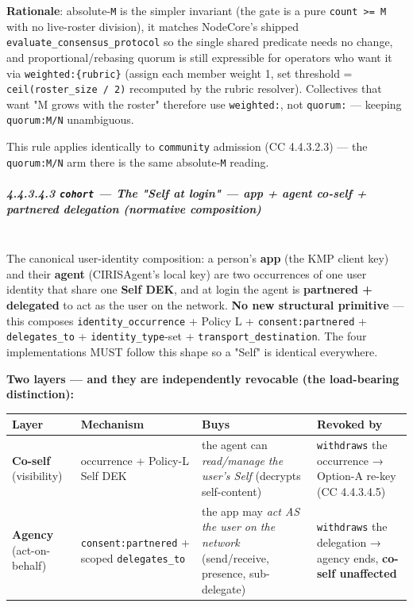 \documentclass[11pt]{article}
\begin{document}
\textbf{Rationale}: absolute-\texttt{M} is the simpler invariant (the gate is a pure \texttt{count >= M} with no live-roster division), it matches NodeCore's shipped \texttt{evaluate\_consensus\_protocol} so the single shared predicate needs no change, and proportional/rebasing quorum is still expressible for operators who want it via \texttt{weighted:\{rubric\}} (assign each member weight 1, set threshold = \texttt{ceil(roster\_size / 2)} recomputed by the rubric resolver). Collectives that want "M grows with the roster" therefore use \texttt{weighted:}, not \texttt{quorum:} — keeping \texttt{quorum:M/N} unambiguous.


This rule applies identically to \texttt{community} admission (CC 4.4.3.2.3) — the \texttt{quorum:M/N} arm there is the same absolute-\texttt{M} reading.


\subparagraph{4.4.3.4.3 \texttt{cohort} — The "Self at login" — app + agent co-self + partnered delegation (normative composition)}\mbox{}\\


The canonical user-identity composition: a person's \textbf{app} (the KMP client key) and their \textbf{agent} (CIRISAgent's local key) are two occurrences of one user identity that share one \textbf{Self DEK}, and at login the agent is \textbf{partnered + delegated} to act as the user on the network. \textbf{No new structural primitive} — this composes \texttt{identity\_occurrence} + Policy L + \texttt{consent:partnered} + \texttt{delegates\_to} + \texttt{identity\_type}-set + \texttt{transport\_destination}. The four implementations MUST follow this shape so a "Self" is identical everywhere.



\textbf{Two layers — and they are independently revocable (the load-bearing distinction):}


{\scriptsize
\begin{longtable}{|p{4.0cm}|p{4.0cm}|p{4.0cm}|p{4.0cm}|}\hline
\textbf{Layer} & \textbf{Mechanism} & \textbf{Buys} & \textbf{Revoked by} \\ \hline\endhead
\textbf{Co-self} (visibility) & occurrence + Policy-L Self DEK & the agent can \textit{read/manage the user's Self} (decrypts self-content) & \texttt{withdraws} the occurrence → Option-A re-key (CC 4.4.3.4.5) \\ \hline
\textbf{Agency} (act-on-behalf) & \texttt{consent:partnered} + scoped \texttt{delegates\_to} & the app may \textit{act AS the user on the network} (send/receive, presence, sub-delegate) & \texttt{withdraws} the delegation → agency ends, \textbf{co-self unaffected} \\ \hline
\end{longtable}}
\end{document}

